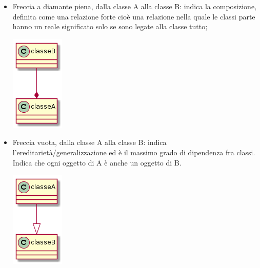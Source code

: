 \begin{itemize}
\begin{minipage}{\linewidth}
        	\end{minipage}
        	\item Freccia a diamante piena, dalla classe A alla classe B: indica la composizione, definita come una relazione forte cioè una relazione nella quale le classi parte hanno un reale significato solo se sono legate alla classe tutto;\par
        	 \begin{minipage}{\linewidth}
        		\centering
        		\includegraphics{composizioneTraAeB.png}
        	\end{minipage}
        	\item Freccia vuota, dalla classe A alla classe B: indica l’ereditarietà/generalizzazione ed è il massimo grado di dipendenza fra classi. Indica che ogni oggetto di A è anche un oggetto di B.\par
        	 \begin{minipage}{\linewidth}
        		\centering
        		\includegraphics{ereditarietaTraAeB.png}
        	\end{minipage}
	    \end{itemize}
	    
